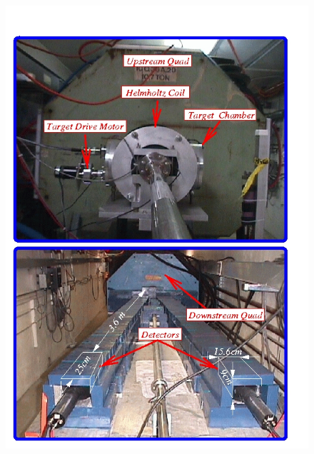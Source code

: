 												
			 \begin{figure}[H]
    			\centering
    			\includegraphics[width=12cm]{Chapters/Ch2-Experiment/clas-12-exp/clas-detectors/other/pics/hall-b-poll-2.jpg}
    			\caption{ }
			\end{figure}
			
